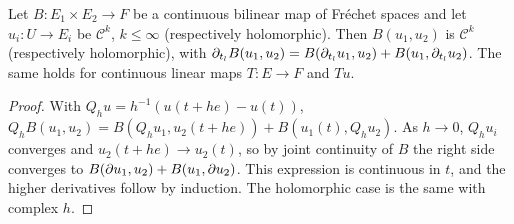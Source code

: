 \begin{lemma}\label{euclidean:lem:product-rule}
  Let $B:E_1\times E_2\to F$ be a continuous bilinear map of Fr\'echet
  spaces and let $u_i:U\to E_i$ be $\mathcal C^k$, $k\le\infty$
  \textup{(}respectively holomorphic\textup{)}. Then $B(u_1,u_2)$ is
  $\mathcal C^k$ \textup{(}respectively holomorphic\textup{)}, with
  $\partial_{t_l}B(u_1,u_2)=B(\partial_{t_l}u_1,u_2)+B(u_1,\partial_{t_l}u_2)$. The same
  holds for continuous linear maps $T:E\to F$ and $Tu$.
\end{lemma}
\begin{proof}
  With $Q_hu=h^{-1}(u(t+h e)-u(t))$,
  $Q_hB(u_1,u_2)=B(Q_hu_1,u_2(t+he))+B(u_1(t),Q_hu_2)$. As $h\to0$,
  $Q_hu_i$ converges and $u_2(t+he)\to u_2(t)$, so by joint continuity of $B$
  the right side converges to $B(\partial u_1,u_2)+B(u_1,\partial u_2)$. This
  expression is continuous in $t$, and the higher derivatives follow by
  induction. The holomorphic case is the same with complex $h$.
\end{proof}

